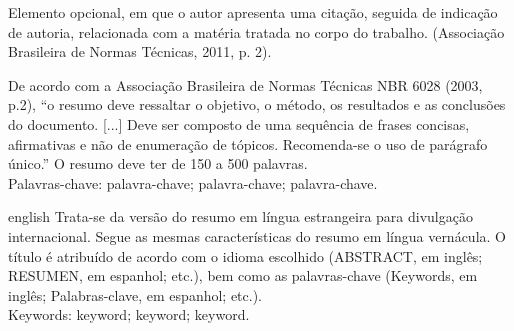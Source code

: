 \documentclass[
  oneside, %
  english,
  brazil
]{abntbibufjf}
\begin{document}

\begin{epigrafemais}
  Elemento opcional, em que o autor apresenta uma citação, seguida de indicação de autoria, relacionada com a
  matéria tratada no corpo do trabalho. (Associação Brasileira de Normas Técnicas, 2011, p. 2).
\end{epigrafemais}



\begin{resumo}
  De acordo com a Associação Brasileira de Normas Técnicas NBR 6028 (2003, p.2), ``o resumo deve ressaltar
  o objetivo, o método, os resultados e as conclusões do documento. [...] Deve ser composto de uma sequência de frases concisas, afirmativas e não de enumeração de tópicos. Recomenda-se o uso de parágrafo único.''
  O resumo deve ter de 150 a 500 palavras.
  \\[18pt]
  Palavras-chave:
  palavra-chave; palavra-chave; palavra-chave.
\end{resumo}


\begin{resumo}[ABSTRACT]
  \begin{otherlanguage*}{english}
    Trata-se da versão do resumo em língua estrangeira para divulgação internacional. Segue as mesmas características do resumo em língua vernácula. O título é atribuído de acordo com o idioma escolhido (ABSTRACT, em inglês; RESUMEN, em espanhol; etc.), bem como as palavras-chave (Keywords, em inglês; Palabras-clave, em espanhol; etc.).
    \\[18pt]
    Keywords:
    keyword; keyword; keyword.
  \end{otherlanguage*}
\end{resumo}

\end{document}
